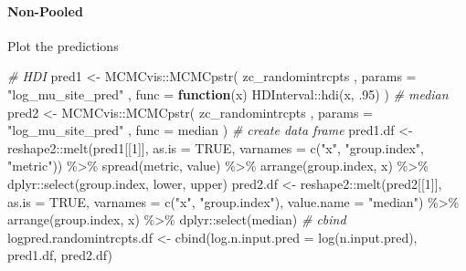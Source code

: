 \documentclass[
]{article}
\newenvironment{Shaded}{\begin{snugshade}}{\end{snugshade}}
\newcommand{\AttributeTok}[1]{\textcolor[rgb]{0.77,0.63,0.00}{#1}}
\newcommand{\CommentTok}[1]{\textcolor[rgb]{0.56,0.35,0.01}{\textit{#1}}}
\newcommand{\ConstantTok}[1]{\textcolor[rgb]{0.00,0.00,0.00}{#1}}
\newcommand{\ControlFlowTok}[1]{\textcolor[rgb]{0.13,0.29,0.53}{\textbf{#1}}}
\newcommand{\DecValTok}[1]{\textcolor[rgb]{0.00,0.00,0.81}{#1}}
\newcommand{\FunctionTok}[1]{\textcolor[rgb]{0.00,0.00,0.00}{#1}}
\newcommand{\NormalTok}[1]{#1}
\newcommand{\OtherTok}[1]{\textcolor[rgb]{0.56,0.35,0.01}{#1}}
\newcommand{\SpecialCharTok}[1]{\textcolor[rgb]{0.00,0.00,0.00}{#1}}
\newcommand{\StringTok}[1]{\textcolor[rgb]{0.31,0.60,0.02}{#1}}
\begin{document}
\hypertarget{non-pooled-1}{%
\paragraph{Non-Pooled}\label{non-pooled-1}}

Plot the predictions

\begin{Shaded}
\begin{Highlighting}[]
\CommentTok{\# HDI}
\NormalTok{pred1 }\OtherTok{\textless{}{-}}\NormalTok{ MCMCvis}\SpecialCharTok{::}\FunctionTok{MCMCpstr}\NormalTok{(}
\NormalTok{  zc\_randomintrcpts}
\NormalTok{  , }\AttributeTok{params =} \StringTok{"log\_mu\_site\_pred"}
\NormalTok{  , }\AttributeTok{func =} \ControlFlowTok{function}\NormalTok{(x) HDInterval}\SpecialCharTok{::}\FunctionTok{hdi}\NormalTok{(x, .}\DecValTok{95}\NormalTok{)}
\NormalTok{)}
\CommentTok{\# median}
\NormalTok{pred2 }\OtherTok{\textless{}{-}}\NormalTok{ MCMCvis}\SpecialCharTok{::}\FunctionTok{MCMCpstr}\NormalTok{(}
\NormalTok{  zc\_randomintrcpts}
\NormalTok{  , }\AttributeTok{params =} \StringTok{"log\_mu\_site\_pred"}
\NormalTok{  , }\AttributeTok{func =}\NormalTok{ median}
\NormalTok{)}
\CommentTok{\# create data frame}
\NormalTok{pred1.df }\OtherTok{\textless{}{-}}\NormalTok{ reshape2}\SpecialCharTok{::}\FunctionTok{melt}\NormalTok{(pred1[[}\DecValTok{1}\NormalTok{]], }\AttributeTok{as.is =} \ConstantTok{TRUE}\NormalTok{, }\AttributeTok{varnames =} \FunctionTok{c}\NormalTok{(}\StringTok{"x"}\NormalTok{, }\StringTok{"group.index"}\NormalTok{, }\StringTok{"metric"}\NormalTok{)) }\SpecialCharTok{\%\textgreater{}\%} 
  \FunctionTok{spread}\NormalTok{(metric, value) }\SpecialCharTok{\%\textgreater{}\%}
  \FunctionTok{arrange}\NormalTok{(group.index, x) }\SpecialCharTok{\%\textgreater{}\%}
\NormalTok{  dplyr}\SpecialCharTok{::}\FunctionTok{select}\NormalTok{(group.index, lower, upper)}
\NormalTok{pred2.df }\OtherTok{\textless{}{-}}\NormalTok{ reshape2}\SpecialCharTok{::}\FunctionTok{melt}\NormalTok{(pred2[[}\DecValTok{1}\NormalTok{]], }\AttributeTok{as.is =} \ConstantTok{TRUE}\NormalTok{, }\AttributeTok{varnames =} \FunctionTok{c}\NormalTok{(}\StringTok{"x"}\NormalTok{, }\StringTok{"group.index"}\NormalTok{), }\AttributeTok{value.name =} \StringTok{"median"}\NormalTok{) }\SpecialCharTok{\%\textgreater{}\%}
  \FunctionTok{arrange}\NormalTok{(group.index, x) }\SpecialCharTok{\%\textgreater{}\%} 
\NormalTok{  dplyr}\SpecialCharTok{::}\FunctionTok{select}\NormalTok{(median)}
\CommentTok{\# cbind}
\NormalTok{logpred.randomintrcpts.df }\OtherTok{\textless{}{-}} \FunctionTok{cbind}\NormalTok{(}\AttributeTok{log.n.input.pred =} \FunctionTok{log}\NormalTok{(n.input.pred), pred1.df, pred2.df)}
\end{Highlighting}
\end{Shaded}
\end{document}
